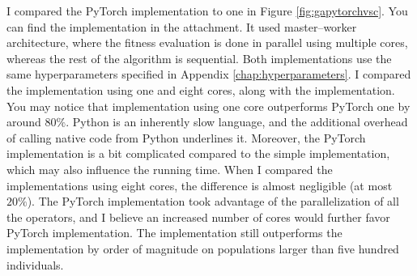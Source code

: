 I compared the PyTorch implementation to \cpp one in Figure \ref{fig:gapytorchvsc}. You can find the \cpp implementation in the attachment. It used master--worker architecture, where the fitness evaluation is done in parallel using multiple cores, whereas the rest of the algorithm is sequential. Both implementations use the same hyperparameters specified in Appendix \ref{chap:hyperparameters}. I compared the implementation using one and eight cores, along with the \gpu implementation. You may notice that \cpp implementation using one core outperforms PyTorch one by around $80\%$. Python is an inherently slow language, and the additional overhead of calling native code from Python underlines it. Moreover, the PyTorch implementation is a bit complicated compared to the simple \cpp implementation, which may also influence the running time. When I compared the implementations using eight cores, the difference is almost negligible (at most $20\%$). The PyTorch implementation took advantage of the parallelization of all the operators, and I believe an increased number of cores would further favor PyTorch implementation. The \gpu implementation still outperforms the \cpp implementation by order of magnitude on populations larger than five hundred individuals.

